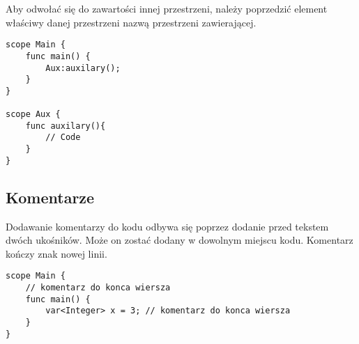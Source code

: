 
Aby odwołać się do zawartości innej przestrzeni, należy poprzedzić element właściwy danej przestrzeni nazwą przestrzeni zawierającej.
\begin{lstlisting}
scope Main {
	func main() {
		Aux:auxilary();	
	}
}

scope Aux {
	func auxilary(){
		// Code
	}
}
\end{lstlisting}

\subsection{Komentarze}
Dodawanie komentarzy do kodu odbywa się poprzez dodanie przed tekstem dwóch ukośników. Może on zostać dodany w dowolnym miejscu kodu. Komentarz kończy znak nowej linii.
\begin{lstlisting}
scope Main {
	// komentarz do konca wiersza
	func main() {
		var<Integer> x = 3; // komentarz do konca wiersza
	}
}
\end{lstlisting}


